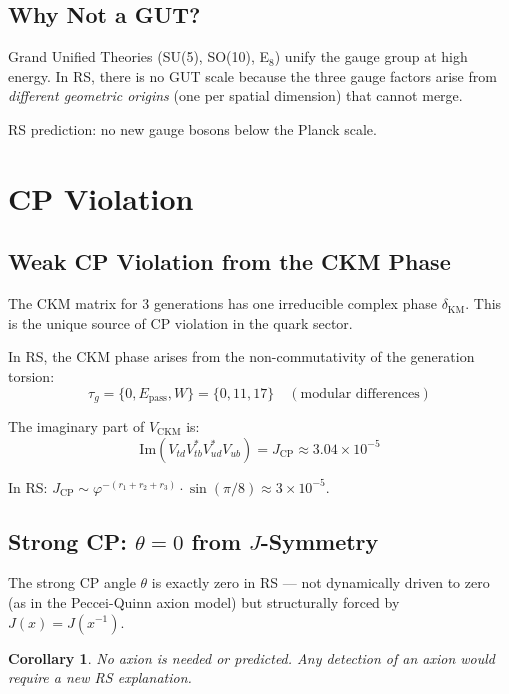 \documentclass[12pt,a4paper]{article}
\newtheorem{corollary}[theorem]{Corollary}
\theoremstyle{definition}
\theoremstyle{remark}
\begin{document}
\subsection{Why Not a GUT?}

Grand Unified Theories (SU(5), SO(10), E$_8$) unify the gauge group at high energy.
In RS, there is no GUT scale because the three gauge factors arise from \emph{different 
geometric origins} (one per spatial dimension) that cannot merge.

RS prediction: no new gauge bosons below the Planck scale.

\section{CP Violation}

\subsection{Weak CP Violation from the CKM Phase}

The CKM matrix for 3 generations has one irreducible complex phase $\delta_\mathrm{KM}$.
This is the unique source of CP violation in the quark sector.

In RS, the CKM phase arises from the non-commutativity of the generation torsion:
\begin{equation}
\tau_g = \{0, E_\mathrm{pass}, W\} = \{0, 11, 17\} \quad (\text{modular differences})
\end{equation}

The imaginary part of $V_\mathrm{CKM}$ is:
\begin{equation}
\mathrm{Im}(V_{td}V_{tb}^* V_{ud}^*V_{ub}) = J_\mathrm{CP} \approx 3.04 \times 10^{-5}
\end{equation}

In RS: $J_\mathrm{CP} \sim \varphi^{-(r_1 + r_2 + r_3)} \cdot \sin(\pi/8) \approx 3 \times 10^{-5}$.

\subsection{Strong CP: $\theta = 0$ from $J$-Symmetry}

The strong CP angle $\theta$ is exactly zero in RS — not dynamically driven to zero 
(as in the Peccei-Quinn axion model) but structurally forced by $J(x) = J(x^{-1})$.

\begin{corollary}
No axion is needed or predicted. Any detection of an axion would require 
a new RS explanation.
\end{corollary}
\end{document}
